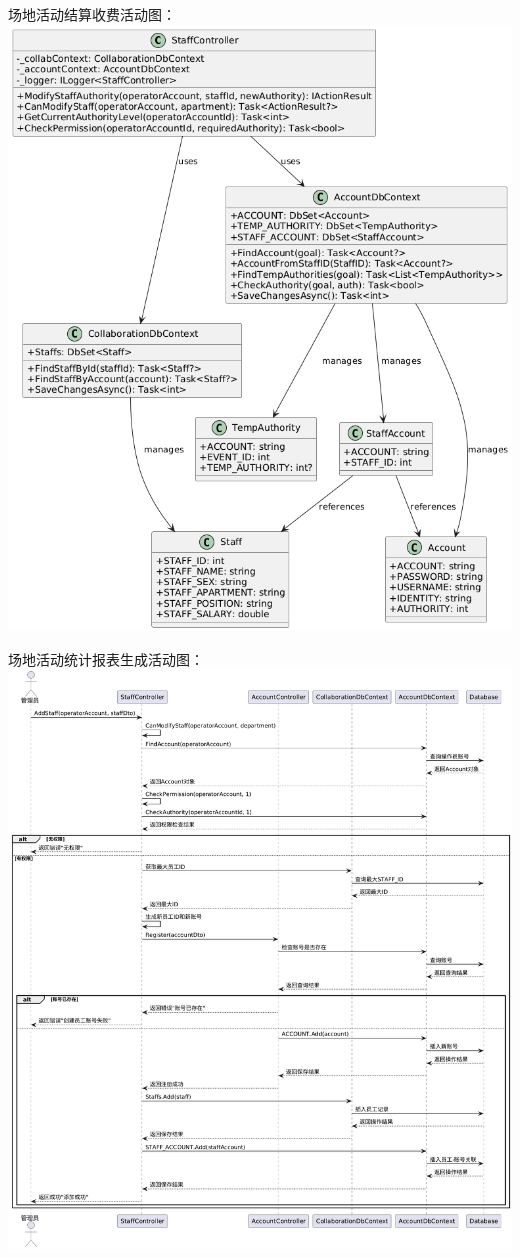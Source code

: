 \documentclass[]{article}
\begin{document}
场地活动结算收费活动图：
\includegraphics{media/media/image14.png}

场地活动统计报表生成活动图：
\includegraphics{media/media/image15.png}
\end{document}

